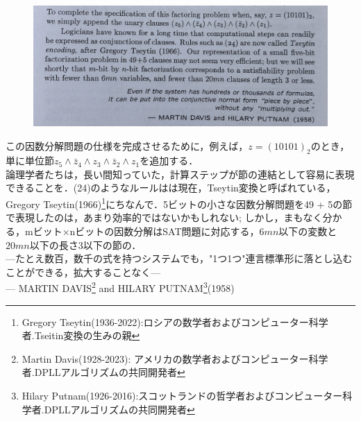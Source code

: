 \documentclass[dvipdfmx,a4paper,12pt]{jsarticle}
\begin{document}
\newpage
\begin{figure}[htbp]
  \centering
  \includegraphics[width=130mm]{images/IMG_73802.jpg}
\end{figure}

この因数分解問題の仕様を完成させるために，例えば，$z=(10101)_{2}$のとき，単に単位節$z_{5}\wedge \bar{z}_{4} \wedge z_{3} \wedge \bar{z}_{2} \wedge z_{1}$を追加する．\\
論理学者たちは，長い間知っていた，計算ステップが節の連結として容易に表現できることを．(24)のようなルールはは現在，Tseytin変換と呼ばれている，Gregory Tseytin(1966)\footnote{Gregory Tseytin(1936-2022):ロシアの数学者およびコンピューター科学者.Tseitin変換の生みの親}にちなんで．5ビットの小さな因数分解問題を49 + 5の節で表現したのは，あまり効率的ではないかもしれない; しかし，まもなく分かる，mビット×nビットの因数分解はSAT問題に対応する，$6mn$以下の変数と$20mn$以下の長さ3以下の節の．\\
---たとえ数百，数千の式を持つシステムでも，"1つ1つ"連言標準形に落とし込むことができる，拡大することなく---\\
--- MARTIN DAVIS\footnote{Martin Davis(1928-2023): アメリカの数学者およびコンピューター科学者.DPLLアルゴリズムの共同開発者} and HILARY PUTNAM\footnote{Hilary Putnam(1926-2016):スコットランドの哲学者およびコンピューター科学者.DPLLアルゴリズムの共同開発者}(1958)
\end{document}
